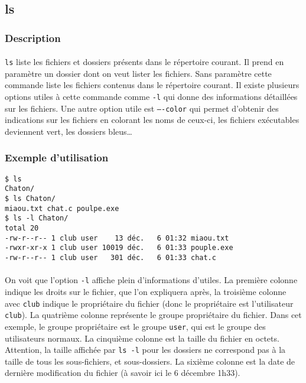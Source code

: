 \subsection{ls}
\subsubsection*{Description}

\paragraph{} \texttt{ls} liste les fichiers et dossiers présents dans le
répertoire courant. Il prend en paramètre un dossier dont on veut lister les
fichiers. Sans paramètre cette commande liste les fichiers contenus dans le
répertoire courant. Il existe plusieurs options utiles à cette commande comme
\texttt{-l} qui donne des informations détaillées sur les fichiers. Une autre
option utile est \texttt{----color} qui permet d'obtenir des indications sur
les fichiers en colorant les noms de ceux-ci, les fichiers exécutables
deviennent vert, les dossiers bleus\ldots

\subsubsection*{Exemple d'utilisation}
\begin{lstlisting}
$ ls
Chaton/
$ ls Chaton/
miaou.txt chat.c poulpe.exe
$ ls -l Chaton/
total 20
-rw-r--r-- 1 club user    13 déc.   6 01:32 miaou.txt
-rwxr-xr-x 1 club user 10019 déc.   6 01:33 pouple.exe
-rw-r--r-- 1 club user   301 déc.   6 01:33 chat.c
\end{lstlisting}

\paragraph{} On voit que l'option \texttt{-l} affiche plein d'informations
d'utiles. La première colonne indique les droits sur le fichier, que l'on
expliquera après, la troisième colonne avec \texttt{club} indique le
propriétaire du fichier (donc le propriétaire est l'utilisateur \texttt{club}).
La quatrième colonne représente le groupe propriétaire du fichier. Dans cet
exemple, le groupe propriétaire est le groupe \texttt{user}, qui est le groupe
des utilisateurs normaux. La cinquième colonne est la taille du fichier en
octets. Attention, la taille affichée par \texttt{ls -l} pour les dossiers ne
correspond pas à la taille de tous les sous-fichiers, et sous-dossiers. La
sixième colonne est la date de dernière modification du fichier (à savoir ici
le 6 décembre 1h33).

